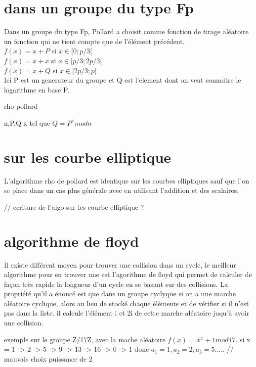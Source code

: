 \documentclass[a4paper,10pt]{report}
\begin{document}
\section{dans un groupe du type Fp}

Dans un groupe du type Fp, Pollard a choisit comme fonction de tirage aléatoire un fonction qui ne tient compte que de l'élément précédent.\\
$ f(x) = x+P$ si $x \in [0;p/3[$\\
$ f(x) = x+x$ si $x \in [p/3;2p/3[$\\
$ f(x) = x+Q$ si $x \in [2p/3;p[$\\
Ici P est un generateur du groupe et Q est l'element dont on veut connaitre le logarithme en base P.
{
\begin{algorithm}
\caption{rho pollard}
\begin{algorithmic}
 \REQUIRE n,P,Q
 \ENSURE x tel que $Q = P^x mod n$
\end{algorithmic}
\end{algorithm}


\section{sur les courbe elliptique}

L'algorithme rho de pollard est identique sur les courbes elliptiques sauf que l'on se place dans un cas plus générale
avec en utilisant l'addition et des scalaires.

// ecriture de l'algo sur les courbe elliptique ?

\section{algorithme de floyd}

Il existe différent moyen pour trouver une collision dans un cycle, le meilleur algorithme pour en trouver
une est l'agorithme de floyd qui permet de calculer de façon très rapide la longueur d'un cycle en se basant sur des collisions.
La propriété qu'il a énoncé est que dans un groupe cyclyque si on a une marche aléatoire cyclique, alors au lieu de stocké chaque 
éléments et de vérifier si il n'est pas dans la liste. il calcule l'élément i et 2i de cette marche aléatoire juqu'à avoir une 
collision.

exemple sur le groupe Z/17Z, avec la mache aléatoire $f(x) = x^x + 1 mod 17$.
si x = 1 -> 2 -> 5 -> 9 -> 13 -> 16 -> 0 -> 1
donc $a_1 = 1, a_2 = 2, a_3 = 5 .....$
// mauvais choix puissance de 2


}
\end{document}
